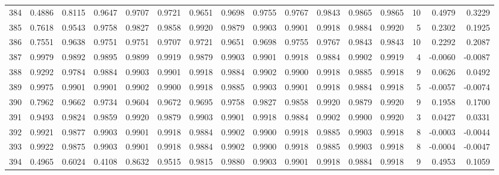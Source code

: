 \begin{tabular}{lrrrrrrrrrrrrrrr}
384 &      0.4886 &  0.8115 &  0.9647 &  0.9707 &  0.9721 &  0.9651 &  0.9698 &  0.9755 &  0.9767 &  0.9843 &   0.9865 &     0.9865 &     10 &                    0.4979 &                     0.3229 \\
385 &      0.7618 &  0.9543 &  0.9758 &  0.9827 &  0.9858 &  0.9920 &  0.9879 &  0.9903 &  0.9901 &  0.9918 &   0.9884 &     0.9920 &      5 &                    0.2302 &                     0.1925 \\
386 &      0.7551 &  0.9638 &  0.9751 &  0.9751 &  0.9707 &  0.9721 &  0.9651 &  0.9698 &  0.9755 &  0.9767 &   0.9843 &     0.9843 &     10 &                    0.2292 &                     0.2087 \\
387 &      0.9979 &  0.9892 &  0.9895 &  0.9899 &  0.9919 &  0.9879 &  0.9903 &  0.9901 &  0.9918 &  0.9884 &   0.9902 &     0.9919 &      4 &                   -0.0060 &                    -0.0087 \\
388 &      0.9292 &  0.9784 &  0.9884 &  0.9903 &  0.9901 &  0.9918 &  0.9884 &  0.9902 &  0.9900 &  0.9918 &   0.9885 &     0.9918 &      9 &                    0.0626 &                     0.0492 \\
389 &      0.9975 &  0.9901 &  0.9901 &  0.9902 &  0.9900 &  0.9918 &  0.9885 &  0.9903 &  0.9901 &  0.9918 &   0.9884 &     0.9918 &      5 &                   -0.0057 &                    -0.0074 \\
390 &      0.7962 &  0.9662 &  0.9734 &  0.9604 &  0.9672 &  0.9695 &  0.9758 &  0.9827 &  0.9858 &  0.9920 &   0.9879 &     0.9920 &      9 &                    0.1958 &                     0.1700 \\
391 &      0.9493 &  0.9824 &  0.9859 &  0.9920 &  0.9879 &  0.9903 &  0.9901 &  0.9918 &  0.9884 &  0.9902 &   0.9900 &     0.9920 &      3 &                    0.0427 &                     0.0331 \\
392 &      0.9921 &  0.9877 &  0.9903 &  0.9901 &  0.9918 &  0.9884 &  0.9902 &  0.9900 &  0.9918 &  0.9885 &   0.9903 &     0.9918 &      8 &                   -0.0003 &                    -0.0044 \\
393 &      0.9922 &  0.9875 &  0.9903 &  0.9901 &  0.9918 &  0.9884 &  0.9902 &  0.9900 &  0.9918 &  0.9885 &   0.9903 &     0.9918 &      8 &                   -0.0004 &                    -0.0047 \\
394 &      0.4965 &  0.6024 &  0.4108 &  0.8632 &  0.9515 &  0.9815 &  0.9880 &  0.9903 &  0.9901 &  0.9918 &   0.9884 &     0.9918 &      9 &                    0.4953 &                     0.1059 \\

\end{tabular}
